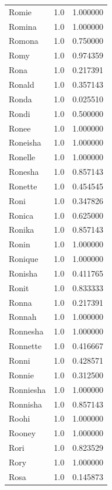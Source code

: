 \documentclass[
  letterpaper,
  DIV=11,
  numbers=noendperiod]{scrreprt}
\begin{document}
\begin{tabular}{lrr}
Romie           &   1.0 &   1.000000 \\
Romina          &   1.0 &   1.000000 \\
Romona          &   1.0 &   0.750000 \\
Romy            &   1.0 &   0.974359 \\
Rona            &   1.0 &   0.217391 \\
Ronald          &   1.0 &   0.357143 \\
Ronda           &   1.0 &   0.025510 \\
Rondi           &   1.0 &   0.500000 \\
Ronee           &   1.0 &   1.000000 \\
Roneisha        &   1.0 &   1.000000 \\
Ronelle         &   1.0 &   1.000000 \\
Ronesha         &   1.0 &   0.857143 \\
Ronette         &   1.0 &   0.454545 \\
Roni            &   1.0 &   0.347826 \\
Ronica          &   1.0 &   0.625000 \\
Ronika          &   1.0 &   0.857143 \\
Ronin           &   1.0 &   1.000000 \\
Ronique         &   1.0 &   1.000000 \\
Ronisha         &   1.0 &   0.411765 \\
Ronit           &   1.0 &   0.833333 \\
Ronna           &   1.0 &   0.217391 \\
Ronnah          &   1.0 &   1.000000 \\
Ronnesha        &   1.0 &   1.000000 \\
Ronnette        &   1.0 &   0.416667 \\
Ronni           &   1.0 &   0.428571 \\
Ronnie          &   1.0 &   0.312500 \\
Ronniesha       &   1.0 &   1.000000 \\
Ronnisha        &   1.0 &   0.857143 \\
Roohi           &   1.0 &   1.000000 \\
Rooney          &   1.0 &   1.000000 \\
Rori            &   1.0 &   0.823529 \\
Rory            &   1.0 &   1.000000 \\
Rosa            &   1.0 &   0.145873 \\

\end{tabular}
\end{document}

